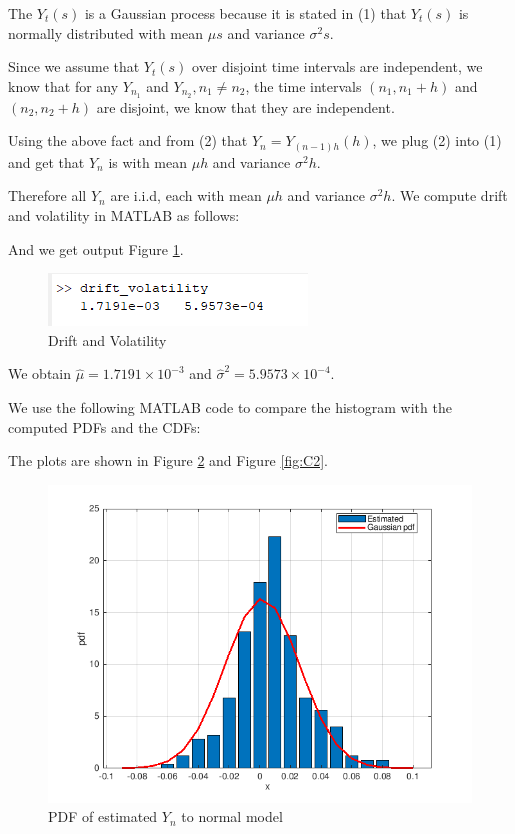 \documentclass{cisXXX} %
\begin{document}
\maketitle
\HWproblem
The $Y_t(s)$ is a Gaussian process because it is stated in (1) that $Y_t(s)$ is normally distributed with mean $\mu s$ and variance $\sigma^2s$.

Since we assume that $Y_t(s)$ over disjoint time intervals are independent, we know that for any $Y _ { n _ { 1 } }$ and $Y _ { n _ { 2 } } , n _ { 1 } \neq n _ { 2 }$, the time intervals $\left( n _ { 1 } , n _ { 1 } + h \right)$ and $\left( n _ { 2 } , n _ { 2 } + h \right)$ are disjoint, we know that they are independent. 

Using the above fact and from (2) that $Y _ { n } = Y _ { ( n - 1 ) h } ( h )$, we plug (2) into (1) and get that $Y_n$ is with mean $\mu h$ and variance $\sigma^2h$.

Therefore all $Y_n$ are i.i.d, each with mean $\mu h$ and variance $\sigma^2h$.
\HWproblem
We compute drift and volatility in MATLAB as follows:


And we get output Figure \ref{fig:B1}.
\begin{figure}
	\includegraphics[width=\linewidth]{B.png} 
	\caption{Drift and Volatility} 
	\label{fig:B1}
\end{figure}

We obtain $\hat { \mu } = 1.7191 \times 10 ^ { - 3 }$ and $\hat { \sigma } ^ { 2 } = 5.9573 \times 10 ^ { - 4 }$.

\HWproblem
We use the following MATLAB code to compare the histogram with the computed PDFs and the CDFs:


The plots are shown in Figure \ref{fig:C1} and Figure \ref{fig:C2}.

\begin{figure}
  \includegraphics[width=\linewidth]{C1.png}
\caption{PDF of estimated $Y_n$ to normal model} 
  \label{fig:C1}
\end{figure}
\end{document}
